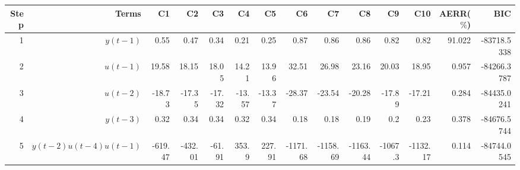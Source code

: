 \begin{tabular}{rrrrrrrrrrrrrr}
Step & Terms & C1 & C2 & C3 & C4 & C5 & C6 & C7 & C8 & C9 & C10 & AERR($\%$) & BIC \\ 
\hline 
1 & $y(t-1)$ & 0.55 & 0.47 & 0.34 & 0.21 & 0.25 & 0.87 & 0.86 & 0.86 & 0.82 & 0.82 & 91.022 & -83718.5338 \\ 
2 & $u(t-1)$ & 19.58 & 18.15 & 18.05 & 14.21 & 13.96 & 32.51 & 26.98 & 23.16 & 20.03 & 18.95 & 0.957 & -84266.3787 \\ 
3 & $u(t-2)$ & -18.73 & -17.35 & -17.32 & -13.57 & -13.37 & -28.37 & -23.54 & -20.28 & -17.89 & -17.21 & 0.284 & -84435.0241 \\ 
4 & $y(t-3)$ & 0.32 & 0.34 & 0.34 & 0.32 & 0.34 & 0.18 & 0.18 & 0.19 & 0.2 & 0.23 & 0.378 & -84676.5744 \\ 
5 & $y(t-2)u(t-4)u(t-1)$ & -619.47 & -432.01 & -61.91 & 353.9 & 227.91 & -1171.68 & -1158.69 & -1163.44 & -1067.3 & -1132.17 & 0.114 & -84744.0545 \\ 
\hline 
\end{tabular}